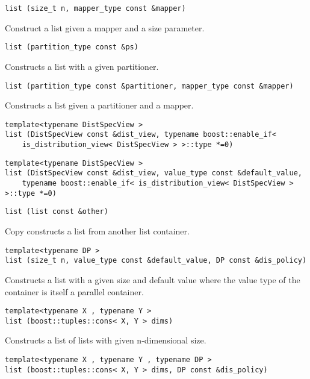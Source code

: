 \begin{verbatim}
list (size_t n, mapper_type const &mapper)
\end{verbatim}

Construct a list given a mapper and a size parameter. 
 
\begin{verbatim}
list (partition_type const &ps)
\end{verbatim}

Constructs a list with a given partitioner. 
 
\begin{verbatim}
list (partition_type const &partitioner, mapper_type const &mapper)
\end{verbatim}

Constructs a list given a partitioner and a mapper. 
 
\begin{verbatim}
template<typename DistSpecView >
list (DistSpecView const &dist_view, typename boost::enable_if< 
    is_distribution_view< DistSpecView > >::type *=0)
\end{verbatim}
 
\begin{verbatim}
template<typename DistSpecView >
list (DistSpecView const &dist_view, value_type const &default_value, 
    typename boost::enable_if< is_distribution_view< DistSpecView > >::type *=0)
\end{verbatim}
 
\begin{verbatim}
list (list const &other)
\end{verbatim}

Copy constructs a list from another list container.
 
\begin{verbatim}
template<typename DP >
list (size_t n, value_type const &default_value, DP const &dis_policy)
\end{verbatim}

Constructs a list with a given size and default value where the value type of the container is itself a parallel container. 
 
\begin{verbatim}
template<typename X , typename Y >
list (boost::tuples::cons< X, Y > dims)
\end{verbatim}

Constructs a list of lists with given n-dimensional size. 
 
\begin{verbatim}
template<typename X , typename Y , typename DP >
list (boost::tuples::cons< X, Y > dims, DP const &dis_policy)
\end{verbatim}

